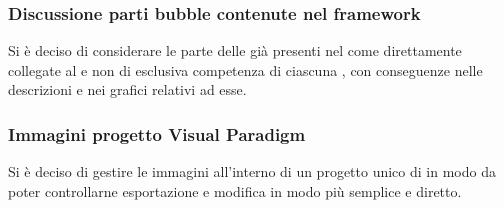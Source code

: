 \subsubsection{Discussione parti bubble contenute nel framework}
Si è deciso di considerare le parte delle  già presenti nel  come direttamente collegate al  e non di esclusiva competenza di ciascuna , con conseguenze nelle descrizioni e nei grafici relativi ad esse.

\subsubsection{Immagini progetto Visual Paradigm}
Si è deciso di gestire le immagini all'interno di un progetto unico di  in modo da poter controllarne esportazione e modifica in modo più semplice e diretto.

\clearpage
